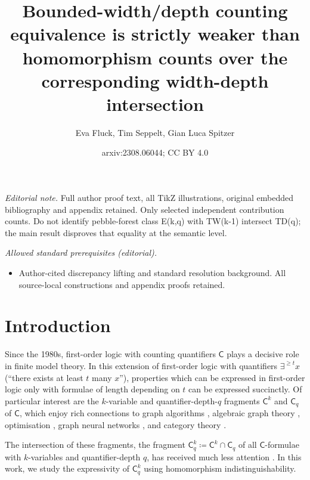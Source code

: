 \documentclass[10pt,a4paper]{article}
\title{Bounded-width/depth counting equivalence is strictly weaker than homomorphism counts over the corresponding width-depth intersection}
\author{Eva Fluck, Tim Seppelt, Gian Luca Spitzer}
\date{arxiv:2308.06044; CC BY 4.0}
\begin{document}
\maketitle
\noindent\textit{Editorial note.} Full author proof text, all TikZ illustrations, original embedded bibliography and appendix retained. Only selected independent contribution counts. Do not identify pebble-forest class E(k,q) with TW(k-1) intersect TD(q); the main result disproves that equality at the semantic level.\par\medskip
\noindent\textit{Allowed standard prerequisites (editorial).}\begin{itemize}
\item Author-cited discrepancy lifting and standard resolution background. All source-local constructions and appendix proofs retained.
\end{itemize}\medskip
\section{Introduction}

Since the 1980s, first-order logic with counting quantifiers $\mathsf{C}$ plays a decisive role in finite model theory.
In this extension of first-order logic with quantifiers $\exists^{\geq t} x$ (``there exists at least $t$ many $x$''), properties which can be expressed in first-order logic only with formulae of length depending on $t$ can be expressed succinctly.
Of particular interest are the $k$-variable and quantifier-depth-$q$ fragments $\mathsf{C}^k$ and $\mathsf{C}_q$ of $\mathsf{C}$, which
enjoy rich connections to graph algorithms \cite{dvorak_recognizing_2010}, algebraic graph theory \cite{dell_lovasz_2018,grohe_homomorphism_2022}, optimisation \cite{grohe_homomorphism_2022,roberson_lasserre_2023}, graph neural networks \cite{grohe_logic_2021}, and category theory \cite{dawar_lovasz-type_2021,abramsky_pebbling_2017}.

The intersection of these fragments, the fragment $\mathsf{C}^k_q \coloneqq \mathsf{C}^k \cap \mathsf{C}_q$ of all $\mathsf{C}$-formulae with $k$-variables and quantifier-depth $q$, has received much less attention \cite{rattan_weisfeiler-leman_2023}. In this work, we study the expressivity of $\mathsf{C}^k_q$ using homomorphism indistinguishability.
\end{document}
